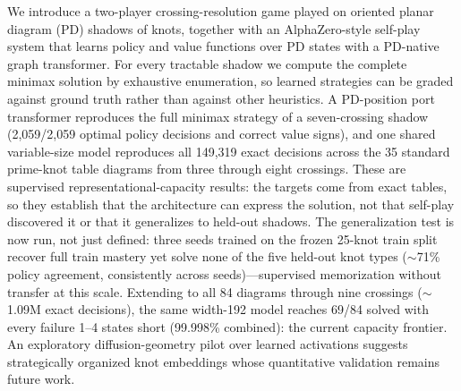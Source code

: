 We introduce a two-player crossing-resolution game played on oriented planar
diagram (PD) shadows of knots, together with an AlphaZero-style self-play
system that learns policy and value functions over PD states with a PD-native
graph transformer. For every tractable shadow we compute the complete minimax
solution by exhaustive enumeration, so learned strategies can be graded against
ground truth rather than against other heuristics. A PD-position port
transformer reproduces the full minimax strategy of a seven-crossing shadow
(2,059/2,059 optimal policy decisions and correct value signs), and one shared
variable-size model reproduces all 149,319 exact decisions across the 35
standard prime-knot table diagrams from three through eight crossings. These
are supervised representational-capacity results: the targets come from exact
tables, so they establish that the architecture can express the solution, not
that self-play discovered it or that it generalizes to held-out shadows. The
generalization test is now run, not just defined: three seeds trained on the
frozen 25-knot train split recover full train mastery yet solve none of the
five held-out knot types ($\sim$71\% policy agreement, consistently across
seeds)---supervised memorization without transfer at this scale. Extending to
all 84 diagrams through nine crossings ($\sim$1.09M exact decisions), the same
width-192 model reaches 69/84 solved with every failure 1--4 states short
(99.998\% combined): the current capacity frontier. An
exploratory diffusion-geometry pilot over learned activations
suggests strategically organized knot embeddings whose quantitative validation
remains future work.
